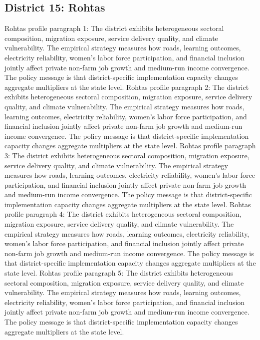 \documentclass[preprint,12pt]{elsarticle}
\begin{document}
\subsection{District 15: Rohtas}
Rohtas profile paragraph 1: The district exhibits heterogeneous sectoral composition, migration exposure, service delivery quality, and climate vulnerability. The empirical strategy measures how roads, learning outcomes, electricity reliability, women's labor force participation, and financial inclusion jointly affect private non-farm job growth and medium-run income convergence. The policy message is that district-specific implementation capacity changes aggregate multipliers at the state level.
Rohtas profile paragraph 2: The district exhibits heterogeneous sectoral composition, migration exposure, service delivery quality, and climate vulnerability. The empirical strategy measures how roads, learning outcomes, electricity reliability, women's labor force participation, and financial inclusion jointly affect private non-farm job growth and medium-run income convergence. The policy message is that district-specific implementation capacity changes aggregate multipliers at the state level.
Rohtas profile paragraph 3: The district exhibits heterogeneous sectoral composition, migration exposure, service delivery quality, and climate vulnerability. The empirical strategy measures how roads, learning outcomes, electricity reliability, women's labor force participation, and financial inclusion jointly affect private non-farm job growth and medium-run income convergence. The policy message is that district-specific implementation capacity changes aggregate multipliers at the state level.
Rohtas profile paragraph 4: The district exhibits heterogeneous sectoral composition, migration exposure, service delivery quality, and climate vulnerability. The empirical strategy measures how roads, learning outcomes, electricity reliability, women's labor force participation, and financial inclusion jointly affect private non-farm job growth and medium-run income convergence. The policy message is that district-specific implementation capacity changes aggregate multipliers at the state level.
Rohtas profile paragraph 5: The district exhibits heterogeneous sectoral composition, migration exposure, service delivery quality, and climate vulnerability. The empirical strategy measures how roads, learning outcomes, electricity reliability, women's labor force participation, and financial inclusion jointly affect private non-farm job growth and medium-run income convergence. The policy message is that district-specific implementation capacity changes aggregate multipliers at the state level.
\end{document}
